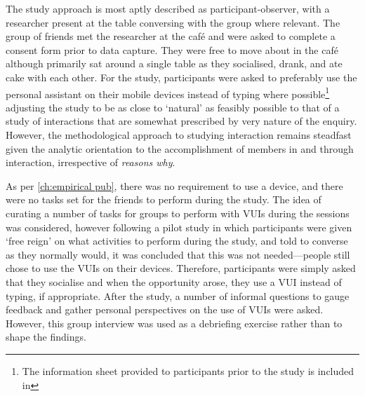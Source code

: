 The study approach is most aptly described as participant-observer, with a researcher present at the table conversing with the group where relevant.
The group of friends met the researcher at the caf\'{e} and were asked to complete a consent form prior to data capture.
They were free to move about in the caf\'{e} although primarily sat around a single table as they socialised, drank, and ate cake with each other.
For the study, participants were asked to preferably use the personal assistant on their mobile devices instead of typing where possible\footnote{The information sheet provided to participants prior to the study is included in } adjusting the study to be as close to `natural' as feasibly possible to that of a study of interactions that are somewhat prescribed by very nature of the enquiry.
However, the methodological approach to studying interaction remains steadfast given the analytic orientation to the accomplishment of members in and through interaction, irrespective of \textit{reasons why}.

As per \autoref{ch:empirical pub}, there was no requirement to use a device, and there were no tasks set for the friends to perform during the study.
The idea of curating a number of tasks for groups to perform with \acp{VUI} during the sessions was considered, however following a pilot study in which participants were given `free reign' on what activities to perform during the study, and told to converse as they normally would, it was concluded that this was not needed–--people still chose to use the \acp{VUI} on their devices.
Therefore, participants were simply asked that they socialise and when the opportunity arose, they use a \ac{VUI} instead of typing, if appropriate.
After the study, a number of informal questions to gauge feedback and gather personal perspectives on the use of \acp{VUI} were asked.
However, this group interview was used as a debriefing exercise rather than to shape the findings.






